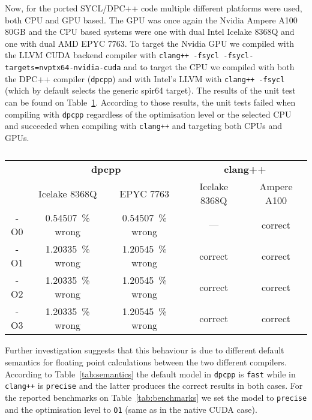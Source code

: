 \documentclass[../main]{subfiles}
\begin{document}
Now, for the ported SYCL/DPC++ code multiple different platforms were used, both CPU and GPU based.
The GPU was once again the Nvidia Ampere A100 80GB and the CPU based systems were one with dual Intel Icelake 8368Q and one with dual AMD EPYC 7763.
To target the Nvidia GPU we compiled with the LLVM CUDA backend compiler with \texttt{clang++ -fsycl -fsycl-targets=nvptx64-nvidia-cuda} and to target the CPU we compiled with both the DPC++ compiler (\texttt{dpcpp}) and with Intel's LLVM with \texttt{clang++ -fsycl} (which by default selects the generic spir64 target).
The results of the unit test can be found on Table~\ref{tab:correctness}.
According to those results, the unit tests failed when compiling with \texttt{dpcpp} regardless of the optimisation level or the selected CPU and succeeded when compiling with \texttt{clang++} and targeting both CPUs and GPUs.
\begin{table}[!htbp]
	\begin{tabular}{@{}c c c c c@{}}
		\toprule
		    & \multicolumn{2}{c}{\textbf{dpcpp}} & \multicolumn{2}{c}{\textbf{clang++}}                               \\
		\cmidrule(lr){2-3}\cmidrule(lr){4-5}
		    & {Icelake 8368Q}                    & EPYC 7763                            & Icelake 8368Q & Ampere A100 \\
		\midrule
		-O0 & \qty{0.54507}{\percent} wrong      & \qty{0.54507}{\percent} wrong        & ---           & correct     \\
		-O1 & \qty{1.20335}{\percent} wrong      & \qty{1.20545}{\percent} wrong        & correct       & correct     \\
		-O2 & \qty{1.20335}{\percent} wrong      & \qty{1.20545}{\percent} wrong        & correct       & correct     \\
		-O3 & \qty{1.20335}{\percent} wrong      & \qty{1.20545}{\percent} wrong        & correct       & correct     \\
		\bottomrule
	\end{tabular}
	\caption{\label{tab:correctness}}
\end{table}

Further investigation suggests that this behaviour is due to different default semantics for floating point calculations between the two different compilers.
According to Table~\ref{tab:semantics} the default model in \texttt{dpcpp} is \texttt{fast} while in \texttt{clang++} is \texttt{precise} and the latter produces the correct results in both cases.
For the reported benchmarks on Table~\ref{tab:benchmarks} we set the model to \texttt{precise} and the optimisation level to \texttt{O1} (same as in the native CUDA case).
\end{document}
